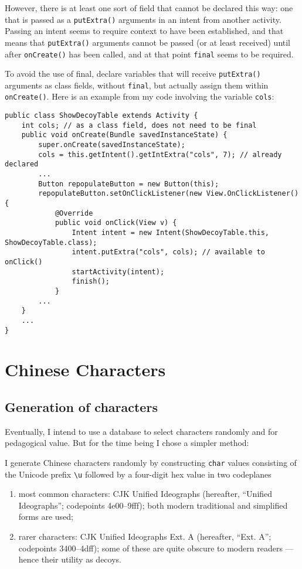 \documentclass[11pt,asymmetric]{article}
\begin{document}
However, there is at least one sort of field that cannot be declared this way: one that is passed as a \texttt{putExtra()} arguments in an intent from another activity. Passing an intent seems to require context to have been established, and that means that \texttt{putExtra()} arguments cannot be passed (or at least received) until after \texttt{onCreate()} has been called, and at that point \texttt{final} seems to be required.

To avoid the use of final, declare variables that will receive \texttt{putExtra()} arguments as class fields, without \texttt{final}, but actually assign them within \texttt{onCreate()}. Here is an example from my code involving the variable \texttt{cols}:\begin{lstlisting}
public class ShowDecoyTable extends Activity {
    int cols; // as a class field, does not need to be final
    public void onCreate(Bundle savedInstanceState) {
        super.onCreate(savedInstanceState);
        cols = this.getIntent().getIntExtra("cols", 7); // already declared
        ...
        Button repopulateButton = new Button(this);
        repopulateButton.setOnClickListener(new View.OnClickListener() {
            @Override
            public void onClick(View v) {
                Intent intent = new Intent(ShowDecoyTable.this, ShowDecoyTable.class);
                intent.putExtra("cols", cols); // available to onClick()
                startActivity(intent);
                finish();
            }
        ...
    }
    ...
}\end{lstlisting}



\section{Chinese Characters}
\subsection{Generation of characters}
Eventually, I intend to use a database to select characters randomly and for pedagogical value. But for the time being I chose a simpler method:

I generate Chinese characters randomly by constructing \texttt{char} values consisting of the Unicode prefix \texttt{\textbackslash u} followed by a four-digit hex value in two codeplanes\begin{enumerate}
\item most common characters: CJK Unified Ideographs (hereafter, ``Unified Ideographs''; codepoints 4e00--9fff); both modern traditional and simplified forms are used;
\item rarer characters: CJK Unified Ideographs Ext. A (hereafter, ``Ext. A''; codepoints 3400--4dff); some of these are quite obscure to modern readers --- hence their utility as decoys.
\end{enumerate}
\end{document}
